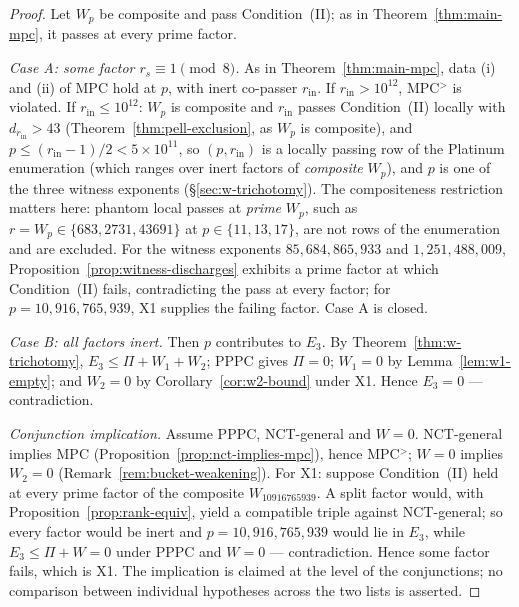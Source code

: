 \documentclass[11pt]{amsart}
\theoremstyle{plain}
\theoremstyle{definition}
\theoremstyle{remark}
\numberwithin{equation}{section}
\begin{document}
\begin{proof}
Let $W_p$ be composite and pass Condition~(II); as in Theorem~\ref{thm:main-mpc}, it passes at every prime factor.

\emph{Case A: some factor $r_s \equiv 1 \pmod 8$.} As in Theorem~\ref{thm:main-mpc}, data (i) and (ii) of MPC hold at $p$, with inert co-passer $r_{\mathrm{in}}$. If $r_{\mathrm{in}} > 10^{12}$, MPC$^{>}$ is violated. If $r_{\mathrm{in}} \leq 10^{12}$: $W_p$ is composite and $r_{\mathrm{in}}$ passes Condition~(II) locally with $d_{r_{\mathrm{in}}} > 43$ (Theorem~\ref{thm:pell-exclusion}, as $W_p$ is composite), and $p \leq (r_{\mathrm{in}}-1)/2 < 5 \times 10^{11}$, so $(p, r_{\mathrm{in}})$ is a locally passing row of the Platinum enumeration (which ranges over inert factors of \emph{composite} $W_p$), and $p$ is one of the three witness exponents (\S\ref{sec:w-trichotomy}). The compositeness restriction matters here: phantom local passes at \emph{prime} $W_p$, such as $r = W_p \in \{683, 2731, 43691\}$ at $p \in \{11, 13, 17\}$, are not rows of the enumeration and are excluded. For the witness exponents $85{,}684{,}865{,}933$ and $1{,}251{,}488{,}009$, Proposition~\ref{prop:witness-discharges} exhibits a prime factor at which Condition~(II) fails, contradicting the pass at every factor; for $p = 10{,}916{,}765{,}939$, X1 supplies the failing factor. Case A is closed.

\emph{Case B: all factors inert.} Then $p$ contributes to $E_3$. By Theorem~\ref{thm:w-trichotomy}, $E_3 \leq \Pi + W_1 + W_2$; PPPC gives $\Pi = 0$; $W_1 = 0$ by Lemma~\ref{lem:w1-empty}; and $W_2 = 0$ by Corollary~\ref{cor:w2-bound} under X1. Hence $E_3 = 0$ --- contradiction.

\emph{Conjunction implication.} Assume PPPC, NCT-general and $W = 0$. NCT-general implies MPC (Proposition~\ref{prop:nct-implies-mpc}), hence MPC$^{>}$; $W = 0$ implies $W_2 = 0$ (Remark~\ref{rem:bucket-weakening}). For X1: suppose Condition~(II) held at every prime factor of the composite $W_{10916765939}$. A split factor would, with Proposition~\ref{prop:rank-equiv}, yield a compatible triple against NCT-general; so every factor would be inert and $p = 10{,}916{,}765{,}939$ would lie in $E_3$, while $E_3 \leq \Pi + W = 0$ under PPPC and $W = 0$ --- contradiction. Hence some factor fails, which is X1. The implication is claimed at the level of the conjunctions; no comparison between individual hypotheses across the two lists is asserted.
\end{proof}
\end{document}
